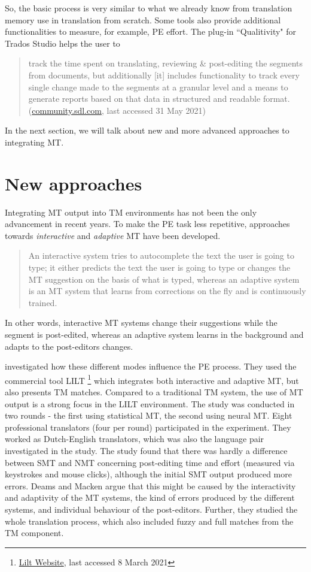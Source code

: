 So, the basic process is very similar to what we already know from translation memory use in translation from scratch. Some tools also provide additional functionalities to measure, for example, PE effort. The plug-in ``Qualitivity" for Trados Studio helps the user to 
\begin{quote}
track the time spent on translating, reviewing \& post-editing the segments from documents, but additionally [it] includes functionality to track every single change made to the segments at a granular level and a means to generate reports based on that data in structured and readable format. (\href{https://community.sdl.com/product-groups/translationproductivity/w/customer-experience/2251/qualitivity}{community.sdl.com}, last accessed 31 May 2021)
\end{quote}

In the next section, we will talk about new and more advanced approaches to integrating MT.

\section{New approaches}\label{sec:6:3}
 
Integrating MT output into TM environments has not been the only advancement in recent years. To make the PE task less repetitive, approaches towards \textit{interactive} and \textit{adaptive} MT have been developed. 
\begin{quote}
    An interactive system tries to autocomplete the text the user is going to type; it either predicts the text the user is going to type or changes the MT suggestion on the basis of what is typed, whereas an adaptive system is an MT system that learns from corrections on the fly and is continuously trained. \citep[118]{daems2019interactive}
\end{quote} 
In other words, interactive MT systems change their suggestions while the segment is post-edited, whereas an adaptive system learns in the background and adapts to the post-editors changes.

\citet{daems2019interactive} investigated how these different modes influence the PE process. They used the commercial tool LILT \footnote{\href{https://lilt.com/}{Lilt Website}, last accessed 8 March 2021} which integrates both interactive and adaptive MT, but also presents TM matches. Compared to a traditional TM system, the use of MT output is a strong focus in the LILT environment. The study was conducted in two rounds - the first using statistical MT, the second using neural MT. Eight professional translators (four per round) participated in the experiment. They worked as Dutch-English translators, which was also the language pair investigated in the study. 
The study found that there was hardly a difference between SMT and NMT concerning post-editing time and effort (measured via keystrokes and mouse clicks), although the initial SMT output produced more errors. Deams and Macken argue that this might be caused by the interactivity and adaptivity of the MT systems, the kind of errors produced by the different systems, and individual behaviour of the post-editors. Further, they studied the whole translation process, which also included fuzzy and full matches from the TM component. 

